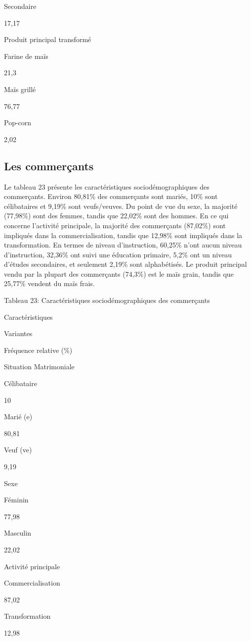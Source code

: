 \documentclass[12pt,oneside]{report}
\begin{document}
Secondaire

17,17

Produit principal transformé

Farine de maïs

21,3

Maïs grillé

76,77

Pop-corn

2,02

\subsection{Les commerçants}
Le tableau 23 présente les caractéristiques sociodémographiques des commerçants. Environ 80,81\% des commerçants sont mariés, 10\% sont célibataires et 9,19\% sont veufs/veuves. Du point de vue du sexe, la majorité (77,98\%) sont des femmes, tandis que 22,02\% sont des hommes. En ce qui concerne l'activité principale, la majorité des commerçants (87,02\%) sont impliqués dans la commercialisation, tandis que 12,98\% sont impliqués dans la transformation. En termes de niveau d'instruction, 60,25\% n'ont aucun niveau d'instruction, 32,36\% ont suivi une éducation primaire, 5,2\% ont un niveau d'études secondaires, et seulement 2,19\% sont alphabétisés. Le produit principal vendu par la plupart des commerçants (74,3\%) est le maïs grain, tandis que 25,77\% vendent du maïs frais.

Tableau 23: Caractéristiques sociodémographiques des commerçants

Caractéristiques

Variantes

Fréquence relative (\%)

Situation Matrimoniale

Célibataire

10

Marié (e)

80,81

Veuf (ve)

9,19

Sexe

Féminin

77,98

Masculin

22,02

Activité principale

Commercialisation

87,02

Transformation

12,98
\end{document}
